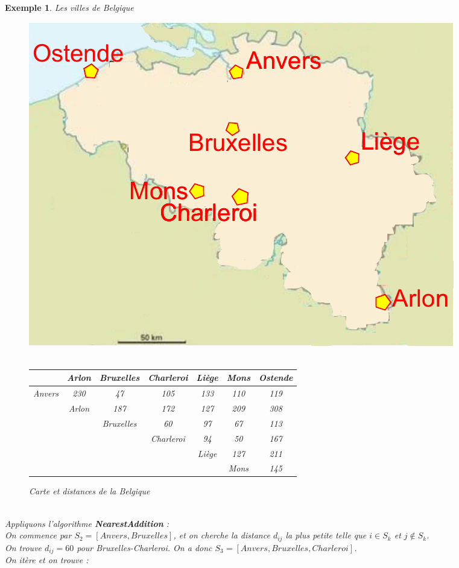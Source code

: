 \documentclass{article}
\newtheorem{exemple}{Exemple}[section]
\begin{document}
\begin{sffamily}
\begin{exemple}Les villes de Belgique\\
\begin{figure}[h!]
    \begin{center}
    \includegraphics[scale=0.5]{belgique.pdf}$ $\\$ $\\
    \begin{tabular}{r|c|c|c|c|c|c|}
	 & Arlon & Bruxelles & Charleroi & Liège & Mons & Ostende \\
	\hline
	Anvers & 230 & 47 & 105 & 133 & 110 & 119 \\
	& Arlon & 187 & 172 & 127 & 209 & 308 \\
	& & Bruxelles & 60 & 97 & 67 & 113 \\
	& & & Charleroi & 94 & 50 & 167 \\
	& & & & Liège & 127 & 211 \\
	& & & & & Mons & 145
	\end{tabular}
    \caption{Carte et distances de la Belgique}
    \end{center}
\end{figure}
$ $\\
Appliquons l'algorithme \textbf{NearestAddition} : \\
On commence par $S_2 = [Anvers,Bruxelles]$, et on cherche la distance $d_{ij}$ la plus petite telle que $i\in S_k$ et $j \not\in S_k$.\\
On trouve $d_{ij} = 60$ pour Bruxelles-Charleroi. On a donc $S_3 = [Anvers,Bruxelles,Charleroi]$.\\
On itère et on trouve : 

\end{exemple}
\end{sffamily}
\end{document}
